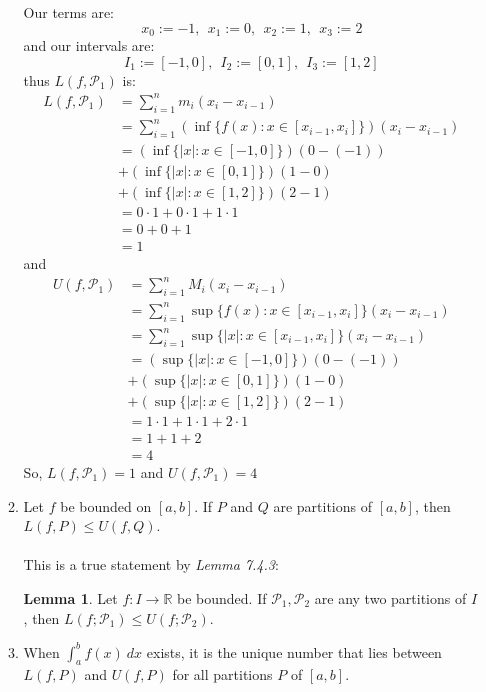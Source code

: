 \documentclass[12pt,letterpaper]{article}
\newcommand{\R}{\mathbb{R}}
\theoremstyle{case}
\theoremstyle{definition}
\newtheorem*{lemma*}{Lemma}
\begin{document}
\begin{enumerate}
\begin{enumerate}
				\\\\Our terms are:
				\[x_0:= -1,\ \ x_1:=0,\ \ x_2:=1,\ \ x_3:=2\]
				and our intervals are:
				\[I_1:=[-1,0],\ \ I_2:=[0,1],\ \ I_3:=[1,2]\]
				thus $L(f,\mathcal{P}_1)$ is:
				\begin{align*}
				L(f,\mathcal{P}_1) &= \sum_{i=1}^{n} m_i(x_i-x_{i-1}) \\
				&= \sum_{i=1}^{n} \left(\inf\{f(x):x \in [x_{i-1},x_i]\}\right) (x_i-x_{i-1}) \\
				&= (\inf \{|x|:x \in [-1,0]\})(0-(-1))\\ 
				&+ (\inf \{|x|: x \in [0,1]\})(1-0)\\
				&+(\inf \{|x|: x\in [1,2]\})(2-1) \\
				&= 0 \cdot 1 + 0 \cdot 1 + 1 \cdot 1 \\
				&= 0+0+1 \\
				&= 1
				\end{align*}
				and
				\begin{align*}
				U(f,\mathcal{P}_1) &= \sum_{i=1}^{n} M_i (x_i-x_{i-1}) \\
				&= \sum_{i=1}^{n} \sup \{f(x): x \in [x_{i-1},x_i]\} (x_i-x_{i-1}) \\
				&= \sum_{i=1}^{n} \sup \{|x|: x \in [x_{i-1},x_i]\} (x_i-x_{i-1}) \\
				&= (\sup \{|x|:x \in [-1,0]\})(0-(-1)) \\
				&+ (\sup \{|x| : x \in [0,1]\})(1-0) \\
				&+ (\sup \{|x|: x \in [1,2]\})(2-1) \\
				&= 1 \cdot 1 + 1 \cdot 1 + 2 \cdot 1 \\
				&= 1 + 1 +2 \\
				&= 4
				\end{align*}
				So, $L(f,\mathcal{P}_1)=1$ and $U(f,\mathcal{P}_1)=4$\\
			\item Let $f$ be bounded on $[a,b]$. If $P$ and $Q$ are partitions of $[a,b]$, then $L(f,P) \leq U(f,Q)$.
			\\\\This is a true statement by \textit{Lemma 7.4.3}:
			\begin{lemma*}
				Let $f:I\to\R$ be bounded. If $\mathcal{P}_1,\mathcal{P}_2$ are any two partitions of $I$, then $L(f;\mathcal{P}_1)\leq U(f;\mathcal{P}_2)$.
			\end{lemma*}
			\item When $\displaystyle\int_{a}^{b} f(x)\ dx$ exists, it is the unique number that lies between $L(f,P)$ and $U(f,P)$ for all partitions $P$ of $[a,b]$.

\end{enumerate}
\end{enumerate}
\end{document}
